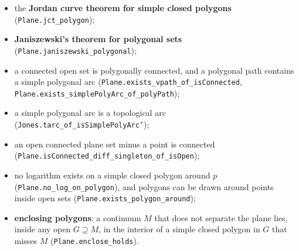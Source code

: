 \documentclass[11pt]{article}
\newcommand{\lean}[1]{\texttt{#1}}
\begin{document}
\begin{itemize}
  \item the \textbf{Jordan curve theorem for simple closed polygons} (\lean{Plane.\hspace{0pt}jct\_\hspace{0pt}polygon});
  \item \textbf{Janiszewski's theorem for polygonal sets} (\lean{Plane.\hspace{0pt}janiszewski\_\hspace{0pt}polygonal});
  \item a connected open set is polygonally connected, and a polygonal path contains a simple polygonal arc (\lean{Plane.\hspace{0pt}exists\_\hspace{0pt}vpath\_\hspace{0pt}of\_\hspace{0pt}isConnected}, \lean{Plane.\hspace{0pt}exists\_\hspace{0pt}simplePolyArc\_\hspace{0pt}of\_\hspace{0pt}polyPath});
  \item a simple polygonal arc is a topological arc (\lean{Jones.\hspace{0pt}tarc\_\hspace{0pt}of\_\hspace{0pt}isSimplePolyArc'});
  \item an open connected plane set minus a point is connected (\lean{Plane.\hspace{0pt}isConnected\_\hspace{0pt}diff\_\hspace{0pt}singleton\_\hspace{0pt}of\_\hspace{0pt}isOpen});
  \item no logarithm exists on a simple closed polygon around $p$ (\lean{Plane.\hspace{0pt}no\_\hspace{0pt}log\_\hspace{0pt}on\_\hspace{0pt}polygon}), and polygons can be drawn around points inside open sets (\lean{Plane.\hspace{0pt}exists\_\hspace{0pt}polygon\_\hspace{0pt}around});
  \item \textbf{enclosing polygons}: a continuum $M$ that does not separate the plane lies, inside any open $G \supseteq M$, in the interior of a simple closed polygon in $G$ that misses $M$ (\lean{Plane.\hspace{0pt}enclose\_\hspace{0pt}holds}).
\end{itemize}
\end{document}
